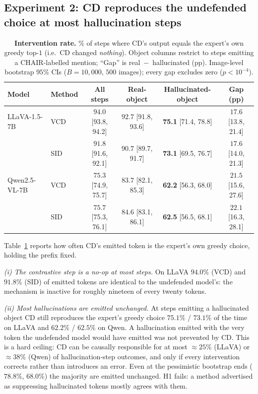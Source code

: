 \documentclass{article}
\begin{document}
\subsection{Experiment 2: CD reproduces the undefended choice at most
hallucination steps}
\label{subsec:cdmech-res-intervention}

\begin{table}[t]
\centering
\small
\setlength{\tabcolsep}{4pt}
\caption{\textbf{Intervention rate.} \% of steps where CD's output equals the
expert's own greedy top-$1$ (i.e.\ CD changed \emph{nothing}). Object columns
restrict to steps emitting a CHAIR-labelled mention; ``Gap'' is
real~$-$~hallucinated (pp). Image-level bootstrap $95\%$ CIs ($B=10{,}000$,
$500$ images); every gap excludes zero ($p<10^{-4}$).}
\label{tab:cdmech-intervention}
\begin{tabular}{llcccc}
\toprule
Model & Method & All steps & Real-object & Hallucinated-object & Gap (pp) \\
\midrule
LLaVA-1.5-7B
 & VCD & $94.0$ \tiny{[93.8, 94.2]} & $92.7$ \tiny{[91.8, 93.6]} & \textbf{75.1} \tiny{[71.4, 78.8]} & $17.6$ \tiny{[13.8, 21.4]} \\
 & SID & $91.8$ \tiny{[91.6, 92.1]} & $90.7$ \tiny{[89.7, 91.7]} & \textbf{73.1} \tiny{[69.5, 76.7]} & $17.6$ \tiny{[14.0, 21.3]} \\
\midrule
Qwen2.5-VL-7B
 & VCD & $75.3$ \tiny{[74.9, 75.7]} & $83.7$ \tiny{[82.1, 85.3]} & \textbf{62.2} \tiny{[56.3, 68.0]} & $21.5$ \tiny{[15.6, 27.6]} \\
 & SID & $75.7$ \tiny{[75.3, 76.1]} & $84.6$ \tiny{[83.1, 86.1]} & \textbf{62.5} \tiny{[56.5, 68.1]} & $22.1$ \tiny{[16.3, 28.1]} \\
\bottomrule
\end{tabular}
\end{table}

Table~\ref{tab:cdmech-intervention} reports how often CD's emitted token is
the expert's own greedy choice, holding the prefix fixed.

\emph{(i) The contrastive step is a no-op at most steps.} On LLaVA $94.0\%$
(VCD) and $91.8\%$ (SID) of emitted tokens are identical to the undefended
model's: the mechanism is inactive for roughly nineteen of every twenty tokens.

\emph{(ii) Most hallucinations are emitted unchanged.} At steps emitting a
hallucinated object CD still reproduces the expert's greedy choice $75.1\%$ /
$73.1\%$ of the time on LLaVA and $62.2\%$ / $62.5\%$ on Qwen. A hallucination
emitted with the very token the undefended model would have emitted was not
prevented by CD. This is a hard ceiling: CD can be causally responsible for at
most ${\approx}25\%$ (LLaVA) or ${\approx}38\%$ (Qwen) of hallucination-step
outcomes, and only if every intervention corrects rather than introduces an
error. Even at the pessimistic bootstrap ends ($78.8\%$, $68.0\%$) the majority
are emitted unchanged. H1 fails: a method advertised as suppressing
hallucinated tokens mostly agrees with them.
\end{document}
